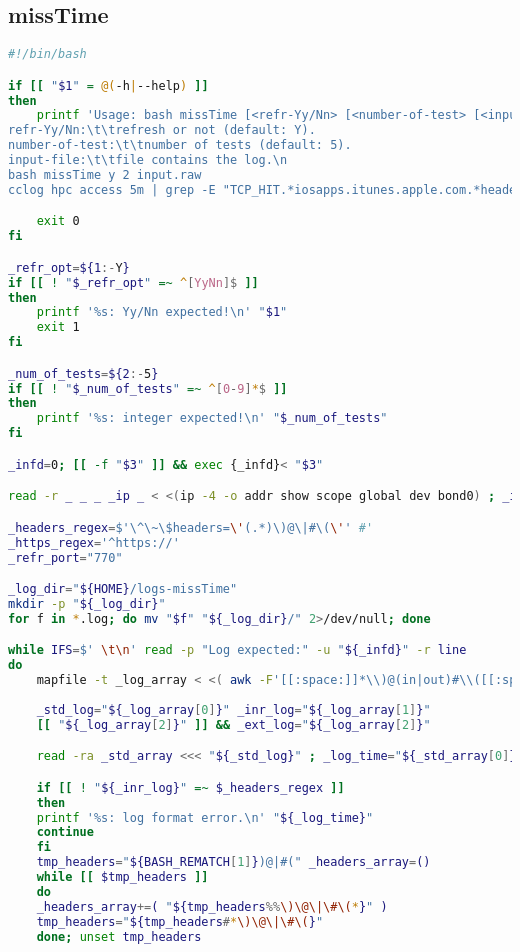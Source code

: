 \begin{appendices}
\section{missTime}
\label{sec:bash-misstime}

\begin{minipage}{0.8\linewidth}
\begin{lstlisting}[language=bash,caption={missTime Line by Line},label={py-misstime-line-by-line},basicstyle=\tiny\ttfamily,linewidth=\textwidth]
#!/bin/bash

if [[ "$1" = @(-h|--help) ]]
then
    printf 'Usage: bash missTime [<refr-Yy/Nn> [<number-of-test> [<input-file>]]]\n
refr-Yy/Nn:\t\trefresh or not (default: Y).
number-of-test:\t\tnumber of tests (default: 5).
input-file:\t\tfile contains the log.\n
bash missTime y 2 input.raw
cclog hpc access 5m | grep -E "TCP_HIT.*iosapps.itunes.apple.com.*headers=" | tail -2 | bash missTime\n'

    exit 0
fi

_refr_opt=${1:-Y}
if [[ ! "$_refr_opt" =~ ^[YyNn]$ ]]
then
    printf '%s: Yy/Nn expected!\n' "$1"
    exit 1
fi

_num_of_tests=${2:-5}
if [[ ! "$_num_of_tests" =~ ^[0-9]*$ ]]
then
    printf '%s: integer expected!\n' "$_num_of_tests"
fi

_infd=0; [[ -f "$3" ]] && exec {_infd}< "$3"

read -r _ _ _ _ip _ < <(ip -4 -o addr show scope global dev bond0) ; _ip="${_ip%/*}"

_headers_regex=$'\^\~\$headers=\'(.*)\)@\|#\(\'' #'
_https_regex='^https://'
_refr_port="770"

_log_dir="${HOME}/logs-missTime"
mkdir -p "${_log_dir}"
for f in *.log; do mv "$f" "${_log_dir}/" 2>/dev/null; done

while IFS=$' \t\n' read -p "Log expected:" -u "${_infd}" -r line
do
    mapfile -t _log_array < <( awk -F'[[:space:]]*\\)@(in|out)#\\([[:space:]]*' '{ for (i = 1; i <= NF; ++i) print $i; }' <<< "${line}" )
    
    _std_log="${_log_array[0]}" _inr_log="${_log_array[1]}"
    [[ "${_log_array[2]}" ]] && _ext_log="${_log_array[2]}"

    read -ra _std_array <<< "${_std_log}" ; _log_time="${_std_array[0]}" _url="${_std_array[6]}"

    if [[ ! "${_inr_log}" =~ $_headers_regex ]]
    then
	printf '%s: log format error.\n' "${_log_time}"
	continue
    fi
    tmp_headers="${BASH_REMATCH[1]})@|#(" _headers_array=()
    while [[ $tmp_headers ]]
    do
	_headers_array+=( "${tmp_headers%%\)\@\|\#\(*}" )
	tmp_headers="${tmp_headers#*\)\@\|\#\(}"
    done; unset tmp_headers
    

\end{lstlisting}
\end{minipage}
\end{appendices}
